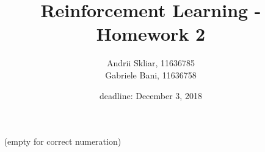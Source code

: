 \documentclass{exam}
\title{Reinforcement Learning - Homework 2} \date{deadline: December 3, 2018}
\author{Andrii Skliar, 11636785\\ Gabriele Bani, 11636758}
\begin{document}
\maketitle 




\begin{problem}[Instructions]
\ \newline
    (empty for correct numeration)
\end{problem}
\end{document}
